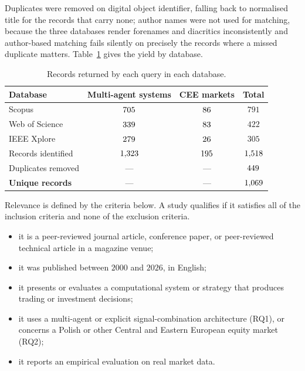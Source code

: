 Duplicates were removed on digital object identifier, falling back to normalised title for the records that carry none; author names were not used for matching, because the three databases render forenames and diacritics inconsistently and author-based matching fails silently on precisely the records where a missed duplicate matters. Table~\ref{tab:slr_sources} gives the yield by database.

\begin{table}[!htbp]
\centering
\caption[Records returned by each query in each database]{Records returned by each query in each database.}
\label{tab:slr_sources}
\begin{tabular}{lccc}
\toprule
\textbf{Database} & \textbf{Multi-agent systems} & \textbf{CEE markets} & \textbf{Total} \\
\midrule
Scopus         & $705$ & $86$ & $791$ \\
Web of Science & $339$    & $83$    & $422$ \\
IEEE Xplore    & $279$   & $26$   & $305$ \\
\midrule
Records identified & $1{,}323$ & $195$ & $1{,}518$ \\
Duplicates removed & --- & --- & $449$ \\
\midrule
\textbf{Unique records} & --- & --- & $1{,}069$ \\
\bottomrule
\end{tabular}
\end{table}

\FloatBarrier

Relevance is defined by the criteria below. A study qualifies if it satisfies all of the inclusion criteria and none of the exclusion criteria.

\begin{itemize}[leftmargin=1.6cm]
    \item[IC1] it is a peer-reviewed journal article, conference paper, or peer-reviewed technical article in a magazine venue;
    \item[IC2] it was published between $2000$ and $2026$, in English;
    \item[IC3] it presents or evaluates a computational system or strategy that produces trading or investment decisions;
    \item[IC4] it uses a multi-agent or explicit signal-combination architecture (RQ1), or concerns a Polish or other Central and Eastern European equity market (RQ2);
    \item[IC5] it reports an empirical evaluation on real market data.
\end{itemize}

